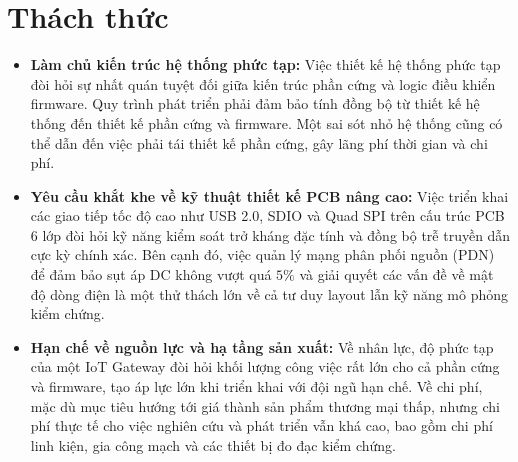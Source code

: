 \section{Thách thức}
    \begin{itemize}
        \item \textbf{Làm chủ kiến trúc hệ thống phức tạp:}
        Việc thiết kế hệ thống phức tạp đòi hỏi sự nhất quán tuyệt đối giữa kiến trúc phần cứng và logic điều khiển firmware. Quy trình phát triển phải đảm bảo tính đồng bộ từ thiết kế hệ thống đến thiết kế phần cứng và firmware. Một sai sót nhỏ hệ thống cũng có thể dẫn đến việc phải tái thiết kế phần cứng, gây lãng phí thời gian và chi phí.
        \item \textbf{Yêu cầu khắt khe về kỹ thuật thiết kế PCB nâng cao:}
        Việc triển khai các giao tiếp tốc độ cao như USB 2.0, SDIO và Quad SPI trên cấu trúc PCB 6 lớp đòi hỏi kỹ năng kiểm soát trở kháng đặc tính và đồng bộ trễ truyền dẫn cực kỳ chính xác. Bên cạnh đó, việc quản lý mạng phân phối nguồn (PDN) để đảm bảo sụt áp DC không vượt quá $5\%$ và giải quyết các vấn đề về mật độ dòng điện là một thử thách lớn về cả tư duy layout lẫn kỹ năng mô phỏng kiểm chứng.
        \item \textbf{Hạn chế về nguồn lực và hạ tầng sản xuất:}
        Về nhân lực, độ phức tạp của một IoT Gateway đòi hỏi khối lượng công việc rất lớn cho cả phần cứng và firmware, tạo áp lực lớn khi triển khai với đội ngũ hạn chế. Về chi phí, mặc dù mục tiêu hướng tới giá thành sản phẩm thương mại thấp, nhưng chi phí thực tế cho việc nghiên cứu và phát triển vẫn khá cao, bao gồm chi phí linh kiện, gia công mạch và các thiết bị đo đạc kiểm chứng.
    \end{itemize}